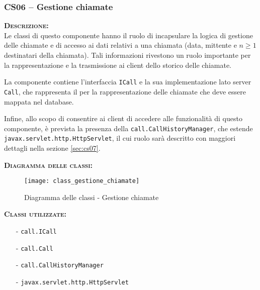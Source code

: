 \subsubsection{CS06 -- Gestione chiamate}\label{sec:cs06}
\begin{description}
  \item{\scshape\bfseries Descrizione:}\\
Le classi di questo componente hanno il ruolo di incapsulare la logica di gestione delle chiamate e di accesso ai dati relativi a una chiamata (data, mittente e $n\geq1$ destinatari della chiamata). Tali informazioni rivestono un ruolo importante per la rappresentazione e la trasmissione ai client dello storico delle chiamate.

La componente contiene l'interfaccia \texttt{ICall} e la sua implementazione lato server \texttt{Call}, che rappresenta il  per la rappresentazione delle chiamate che deve essere mappata nel database.

Infine, allo scopo di consentire ai client di accedere alle funzionalità di questo componente, è prevista la presenza della  \texttt{call.CallHistoryManager}, che estende \texttt{javax.servlet.http.HttpServlet}, il cui ruolo sarà descritto con maggiori dettagli nella sezione \vref{sec:cs07}.

  \item{\scshape\bfseries Diagramma delle classi:}
\begin{figure}[H]
  \centering
  \texttt{[image: class\_gestione\_chiamate]}
  \caption{Diagramma delle classi - Gestione chiamate}\label{fig:gestionechiamate}
\end{figure}

  \item{\scshape\bfseries Classi utilizzate:}\\
  \begin{itemize}[noitemsep,nolistsep]
    \item[-] \texttt{call.ICall}
    \item[-] \texttt{call.Call}
    \item[-] \texttt{call.CallHistoryManager}
    \item[-] \texttt{javax.servlet.http.HttpServlet}
  \end{itemize}
\end{description}

